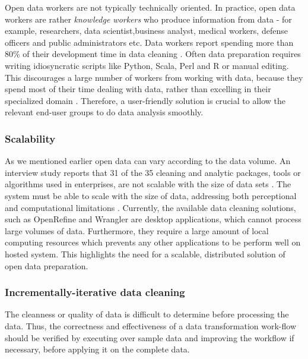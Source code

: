 \noindent  Open data workers are not typically technically oriented. In practice, open data workers are rather \textit{knowledge workers} who produce information from data - for example, researchers, data scientist,business analyst, medical workers, defense officers and public administrators etc. Data workers report spending more than 80\% of their development time in data cleaning \cite{visualizationsandtransformationsinwrangling}\cite{Wisteria}\cite{journals/corr/KrishnanW0FG16}. Often data preparation requires writing idiosyncratic scripts like Python, Scala, Perl and R or manual editing. This discourages a large number of workers from working with data, because they spend most of their time dealing with data, rather than excelling in their specialized domain \cite{visualizationsandtransformationsinwrangling}. Therefore, a user-friendly solution is crucial to allow the relevant end-user groups to do data analysis smoothly.

\subsubsection{Scalability}
\noindent As we mentioned earlier open data can vary according to the data volume. An interview study reports that 31 of the 35 cleaning and analytic packages, tools or algorithms used in enterprises, are not scalable with the size of data sets \cite{2012-enterprise-analysis-interviews}. The system must be able to scale with the size of data, addressing both perceptional and computational limitations \cite{2012-enterprise-analysis-interviews}. Currently, the available data cleaning solutions, such as  OpenRefine \cite{openrefine}  and Wrangler \cite{2011-wrangler} are desktop applications, which cannot process large volumes of data. Furthermore, they require a large amount of local computing resources which prevents any other applications to be perform well on hosted system. This highlights the need for a scalable, distributed solution of open data preparation. 

\subsubsection{Incrementally-iterative data cleaning}
\noindent The cleanness or quality of data is difficult to determine before processing the data. Thus, the correctness and effectiveness of a data transformation work-flow should be verified by executing over sample data and improving the workflow if necessary, before applying it on the complete data. 

